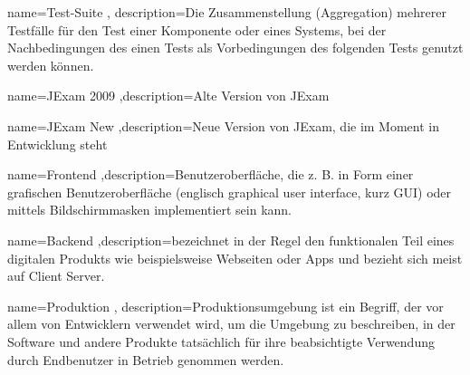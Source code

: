 {name=Test-Suite , description={Die Zusammenstellung (Aggregation) mehrerer Testf\"alle f\"ur den Test einer Komponente oder eines Systems, bei der Nachbedingungen des einen Tests als Vorbedingungen des folgenden Tests genutzt werden k\"onnen.}}

{name=JExam 2009 ,description={Alte Version von JExam}}

{name=JExam New ,description={Neue Version von JExam, die im Moment in Entwicklung steht}}

{name=Frontend ,description={Benutzeroberfläche, die z. B. in Form einer grafischen Benutzeroberfläche (englisch graphical user interface, kurz GUI) oder mittels Bildschirmmasken implementiert sein kann.}}

{name=Backend ,description={bezeichnet in der Regel den funktionalen Teil eines digitalen Produkts wie beispielsweise Webseiten oder Apps und bezieht sich meist auf Client Server.}}

{name=Produktion , description={Produktionsumgebung ist ein Begriff, der vor allem von Entwicklern verwendet wird, um die Umgebung zu beschreiben, in der Software und andere Produkte tatsächlich für ihre beabsichtigte Verwendung durch Endbenutzer in Betrieb genommen werden.}}